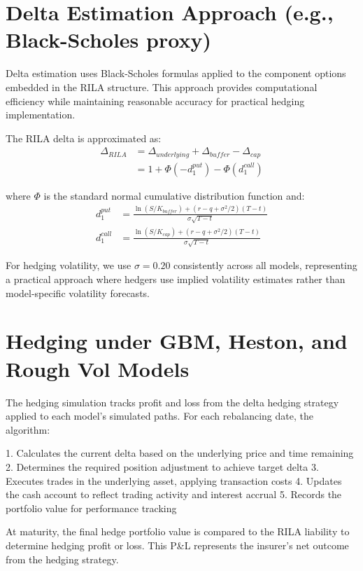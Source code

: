 \documentclass[12pt,a4paper]{report}
\begin{document}
\section{Delta Estimation Approach (e.g., Black-Scholes proxy)}

Delta estimation uses Black-Scholes formulas applied to the component options embedded in the RILA structure. This approach provides computational efficiency while maintaining reasonable accuracy for practical hedging implementation.

The RILA delta is approximated as:
\begin{align}
\Delta_{RILA} &= \Delta_{underlying} + \Delta_{buffer} - \Delta_{cap}\\
&= 1 + \Phi(-d_1^{put}) - \Phi(d_1^{call})
\end{align}

where $\Phi$ is the standard normal cumulative distribution function and:
\begin{align}
d_1^{put} &= \frac{\ln(S/K_{buffer}) + (r - q + \sigma^2/2)(T-t)}{\sigma\sqrt{T-t}}\\
d_1^{call} &= \frac{\ln(S/K_{cap}) + (r - q + \sigma^2/2)(T-t)}{\sigma\sqrt{T-t}}
\end{align}

For hedging volatility, we use $\sigma = 0.20$ consistently across all models, representing a practical approach where hedgers use implied volatility estimates rather than model-specific volatility forecasts.

\section{Hedging under GBM, Heston, and Rough Vol Models}

The hedging simulation tracks profit and loss from the delta hedging strategy applied to each model's simulated paths. For each rebalancing date, the algorithm:

1. Calculates the current delta based on the underlying price and time remaining
2. Determines the required position adjustment to achieve target delta
3. Executes trades in the underlying asset, applying transaction costs
4. Updates the cash account to reflect trading activity and interest accrual
5. Records the portfolio value for performance tracking

At maturity, the final hedge portfolio value is compared to the RILA liability to determine hedging profit or loss. This P\&L represents the insurer's net outcome from the hedging strategy.
\end{document}
